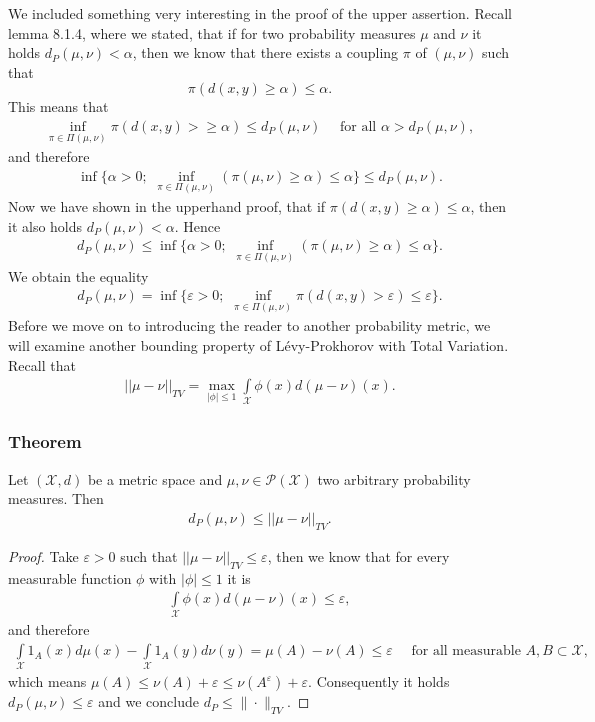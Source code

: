 \documentclass[11pt,a4paper]{article}
\begin{document}
\noindent{}We included something very interesting in the proof of the upper assertion. Recall lemma 8.1.4, where we stated, that if for two probability measures $\mu$ and $\nu$ it holds $d_P(\mu,\nu)<\alpha$, then we know that there exists a coupling $\pi$ of $(\mu,\nu)$ such that 
\[
\pi(d(x,y)\geq\alpha)\leq\alpha.
\]
This means that 
\begin{align*}
\inf\limits_{\pi\in\Pi(\mu,\nu)}\pi(d(x,y)>\geq\alpha)\leq{}d_P(\mu,\nu)\quad\text{ for all }\alpha>d_P(\mu,\nu),
\end{align*}
and therefore
\begin{align*}
\inf\lbrace{}\alpha>0;\,\,\inf\limits_{\pi\in\Pi(\mu,\nu)}\left(\pi(\mu,\nu)\geq\alpha\right)\leq\alpha\rbrace \leq d_P(\mu,\nu).
\end{align*}
Now we have shown in the upperhand proof, that if $\pi(d(x,y)\geq\alpha)\leq\alpha$, then it also holds $d_P(\mu,\nu)<\alpha$. 
Hence
\begin{align*}
d_P(\mu,\nu)\leq \inf\lbrace{}\alpha>0;\,\,\inf\limits_{\pi\in\Pi(\mu,\nu)}\left(\pi(\mu,\nu)\geq\alpha\right)\leq\alpha\rbrace.
\end{align*}
We obtain the equality
\begin{align*}
d_P(\mu,\nu)=\inf\lbrace\varepsilon{}>0;\,\,\inf\limits_{\pi\in\Pi(\mu,\nu)}\pi\left(d(x,y)>\varepsilon\right)\leq\varepsilon\rbrace.
\end{align*}
Before we move on to introducing the reader to another probability metric, we will examine another bounding property of Lévy-Prokhorov with Total Variation.\\
Recall that 
\begin{align*}
||\mu-\nu||_{TV}=\max\limits_{|\phi|\leq{}1}\int\limits_{\mathcal{X}}\phi(x)d(\mu-\nu)(x).
\end{align*}
\subsubsection{Theorem}
Let $(\mathcal{X},d)$ be a metric space and $\mu,\nu\in\mathcal{P(X)}$ two arbitrary probability measures. Then
\begin{align*}
d_P(\mu,\nu)\leq{}||\mu-\nu||_{TV}.
\end{align*}
\begin{proof}
Take $\varepsilon>0$ such that $||\mu-\nu||_{TV}\leq\varepsilon$, then we know that for every measurable function $\phi$ with $|\phi|\leq{}1$ it is 
\begin{align*}
\int\limits_{\mathcal{X}}\phi(x)d(\mu-\nu)(x)\leq\varepsilon,
\end{align*}
and therefore 
\begin{align*}
\int\limits_{\mathcal{X}}1_A(x)d\mu(x) - \int\limits_{\mathcal{X}}1_A(y)d\nu(y) = \mu(A)-\nu(A)\leq\varepsilon\quad\text{ for all measurable }A,B\subset\mathcal{X},
\end{align*}
which means $\mu(A)\leq\nu(A)+\varepsilon\leq\nu(A^{\varepsilon})+\varepsilon$. Consequently it holds $d_P(\mu,\nu)\leq\varepsilon$ and we conclude $d_P\leq{}\|\cdot\|_{TV}.$
\end{proof}
\end{document}
